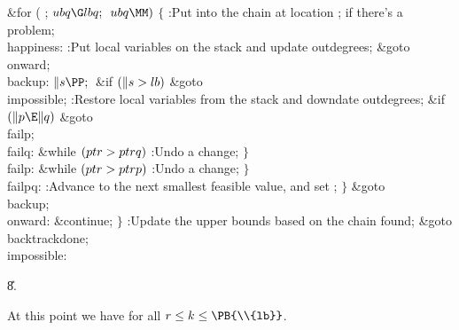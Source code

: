 \&{for} ( ; ${}\\{ubq}\G\\{lbq};{}$ ${}\\{ubq}\MM){}$\5
${}\{{}$\1\6
:Put  into the chain at location ;  if there's a problem\X;\6
\4\\{happiness}:\5
:Put local variables on the stack and update outdegrees\X;\6
\&{goto} \\{onward};\6
\4\\{backup}:\5
${}\|s\PP;{}$\6
\&{if} ${}(\|s>\\{lb}){}$\1\5
\&{goto} \\{impossible};\2\6
:Restore local variables from the stack and downdate outdegrees\X;\6
\&{if} ${}(\|p\E\|q){}$\1\5
\&{goto} \\{failp};\2\6
\4\\{failq}:\5
\&{while} ${}(\\{ptr}>\\{ptrq}){}$\1\5
:Undo a change\X;\2\6
\4${}\}{}$\2\6
\4\\{failp}:\5
\&{while} ${}(\\{ptr}>\\{ptrp}){}$\1\5
:Undo a change\X;\2\6
\4${}\}{}$\2\6
\4\\{failpq}:\5
:Advance  to the next smallest feasible value, and set \X;\6
\4${}\}{}$\2\6
\&{goto} \\{backup};\6
\4\\{onward}:\5
\&{continue};\6
\4${}\}{}$\2\6
:Update the upper bounds based on the chain found\X;\6
\&{goto} \\{backtrackdone};\6
\4\\{impossible}:\par
\U8.\fi

At this point we have  for all $r%
\le k\le\PB{\\{lb}}$.


